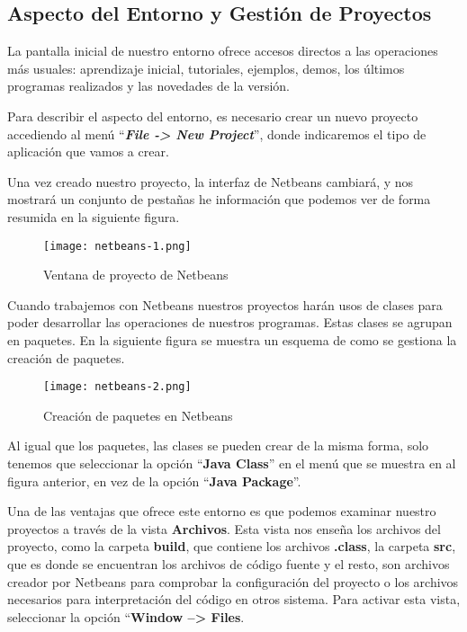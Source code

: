 \subsection{Aspecto del Entorno y Gestión de Proyectos}
La pantalla inicial de nuestro entorno ofrece accesos directos a las operaciones más usuales: aprendizaje inicial, tutoriales, ejemplos, demos, los últimos programas realizados y las novedades de la versión.

Para describir el aspecto del entorno, es necesario crear un nuevo proyecto accediendo al menú ``\textbf{\textit{File -> New Project}}'', donde indicaremos el tipo de aplicación que vamos a crear.

Una vez creado nuestro proyecto, la interfaz de Netbeans cambiará, y nos mostrará un conjunto de pestañas he información que podemos ver de forma resumida en la siguiente figura.

\begin{figure}[H]
    \centering
    \texttt{[image: netbeans-1.png]}
    \caption{Ventana de proyecto de Netbeans}
\end{figure}

Cuando trabajemos con Netbeans nuestros proyectos harán usos de clases para poder desarrollar las operaciones de nuestros programas. Estas clases se agrupan en paquetes. En la siguiente figura se muestra un esquema de como se gestiona la creación de paquetes.

\begin{figure}[H]
    \centering
    \texttt{[image: netbeans-2.png]}
    \caption{Creación de paquetes en Netbeans}
\end{figure}

Al igual que los paquetes, las clases se pueden crear de la misma forma, solo tenemos que seleccionar la opción ``\textbf{Java Class}'' en el menú que se muestra en al figura anterior, en vez de la opción ``\textbf{Java Package}''.

Una de las ventajas que ofrece este entorno es que podemos examinar nuestro proyectos a través de la vista \textbf{Archivos}. Esta vista nos enseña los archivos del proyecto, como la carpeta \textbf{build}, que contiene los archivos \textbf{.class}, la carpeta \textbf{src}, que es donde se encuentran los archivos de código fuente y el resto, son archivos creador por Netbeans para comprobar la configuración del proyecto o los archivos necesarios para interpretación del código en otros sistema. Para activar esta vista, seleccionar la opción ``\textbf{Window --> Files}.

